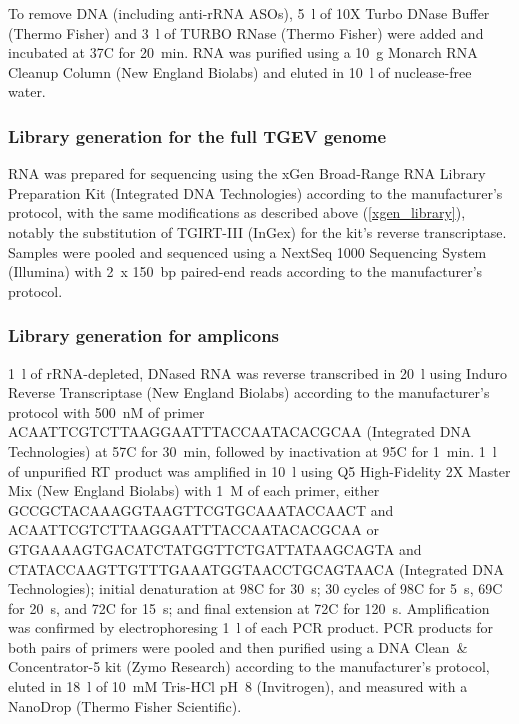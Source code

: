 \documentclass[main.tex]{subfiles}
\begin{document}
To remove DNA (including anti-rRNA ASOs), 5~\textmu l of 10X Turbo DNase Buffer (Thermo Fisher) and 3~\textmu l of TURBO RNase (Thermo Fisher) were added and incubated at 37\textdegree C for 20~min.
RNA was purified using a 10~\textmu g Monarch RNA Cleanup Column (New England Biolabs) and eluted in 10~\textmu l of nuclease-free water.

\subsubsection{Library generation for the full TGEV genome}

RNA was prepared for sequencing using the xGen Broad-Range RNA Library Preparation Kit (Integrated DNA Technologies) according to the manufacturer’s protocol, with the same modifications as described above (\ref{xgen_library}), notably the substitution of TGIRT-III (InGex) for the kit's reverse transcriptase.
Samples were pooled and sequenced using a NextSeq 1000 Sequencing System (Illumina) with 2~x 150~bp paired-end reads according to the manufacturer's protocol.

\subsubsection{Library generation for amplicons}

1~\textmu l of rRNA-depleted, DNased RNA was reverse transcribed in 20~\textmu l using Induro Reverse Transcriptase (New England Biolabs) according to the manufacturer's protocol with 500~nM of primer ACAATTCGTCTTAAGGAATTTACCAATACACGCAA (Integrated DNA Technologies) at 57\textdegree C for 30~min, followed by inactivation at 95\textdegree C for 1~min.
1~\textmu l of unpurified RT product was amplified in 10~\textmu l using Q5 High-Fidelity 2X Master Mix (New England Biolabs) with 1~\textmu M of each primer, either GCCGCTACAAAGGTAAGTTCGTGCAAATACCAACT and ACAATTCGTCTTAAGGAATTTACCAATACACGCAA or GTGAAAAGTGACATCTATGGTTCTGATTATAAGCAGTA and CTATACCAAGTTGTTTGAAATGGTAACCTGCAGTAACA (Integrated DNA Technologies); initial denaturation at 98\textdegree C for 30~s; 30 cycles of 98\textdegree C for 5~s, 69\textdegree C for 20~s, and 72\textdegree C for 15~s; and final extension at 72\textdegree C for 120~s.
Amplification was confirmed by electrophoresing 1~\textmu l of each PCR product.
PCR products for both pairs of primers were pooled and then purified using a DNA Clean~\& Concentrator-5 kit (Zymo Research) according to the manufacturer's protocol, eluted in 18~\textmu l of 10~mM Tris-HCl pH~8 (Invitrogen), and measured with a NanoDrop (Thermo Fisher Scientific).
\end{document}

